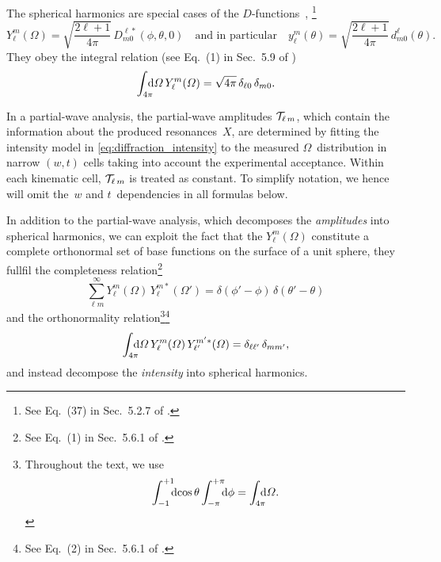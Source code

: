 The spherical harmonics are special cases of the
$D$-functions~\cite{wikipedia:wignerD}, \ie\footnote{See Eq.~(37) in
Sec.~5.2.7 of .}
\begin{equation}
  \label{eq:spherical_harm_wigner_d}
  Y_\ell^m(\Omega)
  = \sqrt{\frac{2 \ell + 1}{4 \pi}}\, D^{\ell *}_{m 0}(\phi, \theta, 0)
  \quad\text{and in particular}\quad
  y_\ell^m(\theta)
  = \sqrt{\frac{2 \ell + 1}{4 \pi}}\, d^\ell_{m 0}(\theta).
\end{equation}
They obey the integral relation (see Eq.~(1) in Sec.~5.9 of
)
\begin{equation}
  \label{eq:spherical_harmonics_integral}
  \int_{4 \pi}\!\!\!\! \dif{\Omega}\, Y_\ell^m(\Omega)
  = \sqrt{4 \pi}\, \delta_{\ell 0}\, \delta_{m 0}.
\end{equation}

In a partial-wave analysis, the partial-wave amplitudes
$\mathcal{T}_{\ell\, m}$, which contain the information about the
produced resonances~$X$, are determined by fitting the intensity model
in \cref{eq:diffraction_intensity} to the measured
$\Omega$~distribution in narrow $(w, t)$ cells taking into account the
experimental acceptance.  Within each kinematic cell,
$\mathcal{T}_{\ell\, m}$ is treated as constant.  To simplify notation,
we hence will omit the~$w$ and $t$~dependencies in all formulas below.

In addition to the partial-wave analysis, which decomposes the
\emph{amplitudes} into spherical harmonics, we can exploit the fact
that the $Y_\ell^m(\Omega)$ constitute a complete orthonormal set of
base functions on the surface of a unit sphere, \ie they fullfil the
completeness relation\footnote{See Eq.~(1) in Sec.~5.6.1 of
.}
\begin{equation}
  \label{eq:spherical_harm_complete}
  \sum_{\ell m}^\infty Y_\ell^m(\Omega)\, Y_\ell^{m *}(\Omega')
  = \delta(\phi' - \phi)\, \delta(\theta' - \theta)
\end{equation}
and the orthonormality relation\footnote{%
Throughout the text, we use
\begin{equation}
  \int_{-1}^{+1}\!\!\! \dif{\cos\theta} \int_{-\pi}^{+\pi}\!\!\! \dif{\phi}
  = \int_{4 \pi}\!\!\!\! \dif{\Omega}.
\end{equation}
}\footnote{See Eq.~(2) in Sec.~5.6.1 of
.}
\begin{equation}
  \label{eq:spherical_harm_orthonorm}
  \int_{4 \pi}\!\!\!\! \dif{\Omega}\, Y_\ell^m(\Omega)\, Y_{\ell'}^{m' *}(\Omega)
  = \delta_{\ell \ell'}\, \delta_{m m'},
\end{equation}
and instead decompose the \emph{intensity} into spherical harmonics.

